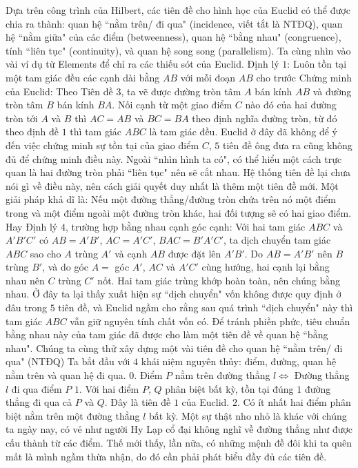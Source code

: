 \begin{multicols}{2}
	\vskip 0.1cm
	Dựa trên công trình của Hilbert, các tiên đề cho hình học của Euclid có thể được chia ra thành: quan hệ ``nằm trên/ đi qua" (incidence, viết tắt là NTĐQ), quan hệ ``nằm giữa" của các điểm (betweenness), quan hệ ``bằng nhau" (congruence), tính ``liên tục" (continuity), và quan hệ song song (parallelism). 
	\vskip 0.1cm
	Ta cùng nhìn vào vài ví dụ từ Elements để chỉ ra các thiếu sót của Euclid. 
	\vskip 0.1cm
	Định lý $1$: Luôn tồn tại một tam giác đều các cạnh dài bằng $AB$ với mỗi đoạn $AB$ cho trước 
	\vskip 0.1cm
	Chứng minh của Euclid: Theo Tiên đề $3$, ta vẽ được đường tròn tâm $A$ bán kính $AB$ và đường tròn tâm $B$ bán kính $BA$. Nối cạnh từ một giao điểm $C$ nào đó của hai đường tròn tới $A$ và $B$ thì $AC = AB$ và $BC = BA$ theo định nghĩa đường tròn, từ đó theo định đề $1$ thì tam giác $ABC$ là tam giác đều.
	\vskip 0.1cm
	Euclid ở đây đã không để ý đến việc chứng minh sự tồn tại của giao điểm $C$, $5$ tiên đề ông đưa ra cũng không đủ để chứng minh điều này. Ngoài ``nhìn hình ta có", có thể hiểu một cách trực quan là hai đường tròn phải ``liên tục" nên sẽ cắt nhau. Hệ thống tiên đề lại chưa nói gì về điều này, nên cách giải quyết duy nhất là thêm một tiên đề mới. Một giải pháp khả dĩ là:
	\vskip 0.1cm
	Nếu một đường thẳng/đường tròn chứa trên nó một điểm trong và một điểm ngoài một đường tròn khác, hai đối tượng sẽ có hai giao điểm.
	\vskip 0.1cm
	Hay Định lý $4$, trường hợp bằng nhau cạnh góc cạnh: Với hai tam giác $ABC$ và $A'B'C'$ có $AB = A'B'$, $AC = A'C'$, $BAC = B'A'C'$, ta dịch chuyển tam giác $ABC$ sao cho $A$ trùng $A'$ và cạnh $AB$ được đặt lên $A'B'$. Do $AB = A'B'$ nên $B$ trùng $B'$, và do góc $A =$ góc $A'$, $AC$ và $A'C'$ cùng hướng, hai cạnh lại bằng nhau nên $C$ trùng $C'$ nốt. Hai tam giác trùng khớp hoàn toàn, nên chúng bằng nhau.
	\vskip 0.1cm
	Ở đây ta lại thấy xuất hiện sự ``dịch chuyển" vốn không được quy định ở đâu trong $5$ tiên đề, và Euclid ngầm cho rằng sau quá trình ``dịch chuyển" này thì tam giác $ABC$ vẫn giữ nguyên tính chất vốn có. Để tránh phiền phức, tiêu chuẩn bằng nhau này của tam giác đã được cho làm một tiên đề về quan hệ ``bằng nhau".
	\vskip 0.1cm
	Chúng ta cùng thử xây dựng một vài tiên đề cho quan hệ ``nằm trên/ đi qua" (NTĐQ)
	\vskip 0.1cm
	Ta bắt đầu với $4$ khái niệm nguyên thủy: điểm, đường, quan hệ nằm trên và quan hệ đi qua.
	\vskip 0.1cm
	$0.$ Điểm $P$ nằm trên đường thẳng $l \Leftrightarrow$ Đường thẳng $l$ đi qua điểm $P$
	\vskip 0.1cm
	$1.$ Với hai điểm $P$, $Q$ phân biệt bất kỳ, tồn tại đúng $1$ đường thẳng đi qua cả $P$ và $Q$. Đây là tiên đề $1$ của Euclid.
	\vskip 0.1cm
	$2.$ Có ít nhất hai điểm phân biệt nằm trên một đường thẳng $l$ bất kỳ. Một sự thật nho nhỏ là khác với chúng ta ngày nay, có vẻ như người Hy Lạp cổ đại không nghĩ về đường thẳng như được cấu thành từ các điểm. Thế mới thấy, lần nữa, có những mệnh đề đôi khi ta quên mất là mình ngầm thừa nhận, do đó cần phải phát biểu đầy đủ các tiên đề.

\end{multicols}
